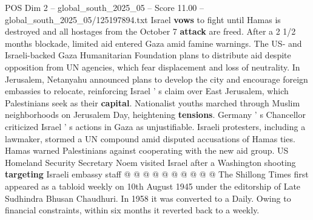 \begin{textsample}{POS Dim 2 – global\_south\_2025\_05 – Score 11.00 – global\_south\_2025\_05/125197894.txt}
Israel \textbf{vows} to fight until Hamas is destroyed and all hostages from the October 7 \textbf{attack} are freed.
After a 2 1/2 months blockade, limited aid entered Gaza amid famine warnings.
The US- and Israeli-backed Gaza Humanitarian Foundation plans to distribute aid despite opposition from UN agencies, which fear displacement and loss of neutrality.
In Jerusalem, Netanyahu announced plans to develop the city and encourage foreign embassies to relocate, reinforcing Israel ' s claim over East Jerusalem, which Palestinians seek as their \textbf{capital}.
Nationalist youths marched through Muslim neighborhoods on Jerusalem Day, heightening \textbf{tensions}.
Germany ' s Chancellor criticized Israel ' s actions in Gaza as unjustifiable.
Israeli protesters, including a lawmaker, stormed a UN compound amid disputed accusations of Hamas ties.
Hamas warned Palestinians against cooperating with the new aid group.
US Homeland Security Secretary Noem visited Israel after a Washington shooting \textbf{targeting} Israeli embassy staff @ @ @ @ @ @ @ @ @ @ The Shillong Times first appeared as a tabloid weekly on 10th August 1945 under the editorship of Late Sudhindra Bhusan Chaudhuri.
In 1958 it was converted to a Daily.
Owing to financial constraints, within six months it reverted back to a weekly.

\end{textsample}
